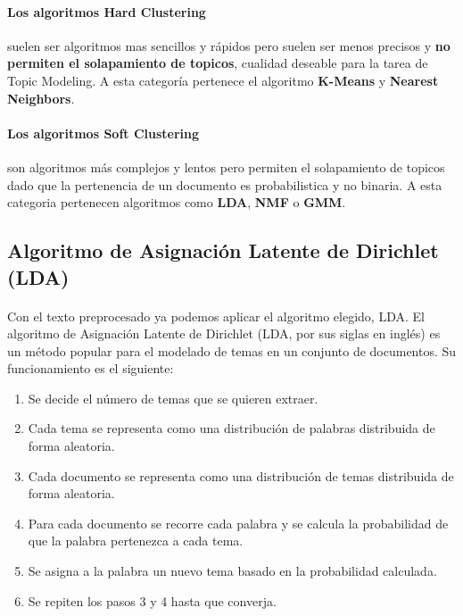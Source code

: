 \documentclass{report}
\begin{document}
                \paragraph*{Los algoritmos Hard Clustering}{
                    suelen ser algoritmos mas sencillos y rápidos pero suelen ser menos precisos y \textbf{no permiten el solapamiento de topicos}, cualidad deseable para la tarea de Topic Modeling. A esta categoría pertenece el algoritmo \textbf{K-Means} y \textbf{Nearest Neighbors}.
                }
                \paragraph*{Los algoritmos Soft Clustering}{
                    son algoritmos más complejos y lentos pero permiten el solapamiento de topicos dado que la pertenencia de un documento es probabilistica y no binaria. A esta categoria pertenecen algoritmos como \textbf{LDA}, \textbf{NMF} o \textbf{GMM}.
                }
            \clearpage\subsection{Algoritmo de Asignación Latente de Dirichlet (LDA)}
                \paragraph*{}{
                    Con el texto preprocesado ya podemos aplicar el algoritmo elegido, LDA.
                    El algoritmo de Asignación Latente de Dirichlet (LDA, por sus siglas en inglés) es un método popular para el modelado de temas en un conjunto de documentos.
                    Su funcionamiento es el siguiente:
                }
                \begin{enumerate}
                    \item Se decide el número de temas que se quieren extraer.
                    \item Cada tema se representa como una distribución de palabras distribuida de forma aleatoria.
                    \item Cada documento se representa como una distribución de temas distribuida de forma aleatoria.
                    \item Para cada documento se recorre cada palabra y se calcula la probabilidad de que la palabra pertenezca a cada tema.
                    \item Se asigna a la palabra un nuevo tema basado en la probabilidad calculada.
                    \item Se repiten los pasos 3 y 4 hasta que converja.
                \end{enumerate}
\end{document}
